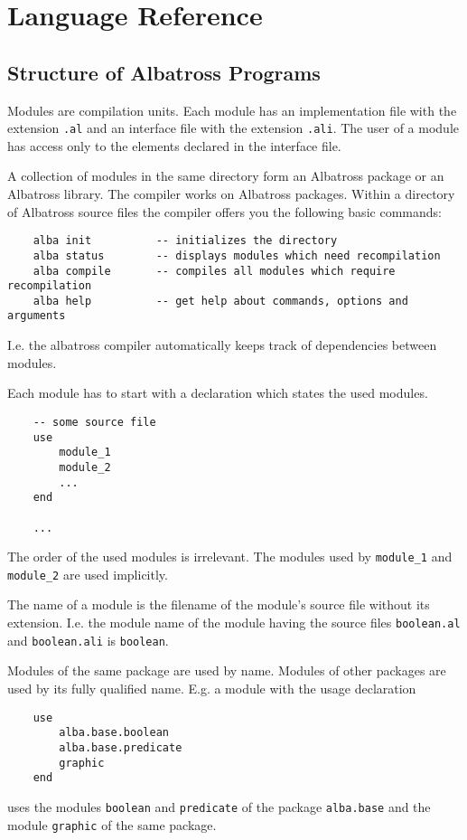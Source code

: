 \chapter{Language Reference}

\section{Structure of Albatross Programs}

Modules are compilation units. Each module has an implementation file with the
extension \lstinline!.al! and an interface file with the extension
\lstinline!.ali!. The user of a module has access only to the elements
declared in the interface file.

A collection of modules in the same directory form an Albatross package or an
Albatross library. The compiler works on Albatross packages. Within a
directory of Albatross source files the compiler offers you the following
basic commands:

\begin{lstlisting}
    alba init          -- initializes the directory
    alba status        -- displays modules which need recompilation
    alba compile       -- compiles all modules which require recompilation
    alba help          -- get help about commands, options and arguments
\end{lstlisting}
  
I.e. the albatross compiler automatically keeps track of dependencies between
modules.

Each module has to start with a declaration which states the used modules.

\begin{lstlisting}
    -- some source file
    use
        module_1
        module_2
        ...
    end
    
    ...
\end{lstlisting}

The order of the used modules is irrelevant. The modules used by \lstinline!module_1!
and \lstinline!module_2! are used implicitly.

The name of a module is the filename of the module's source file without its
extension. I.e. the module name of the module having the source files
\lstinline!boolean.al! and \lstinline!boolean.ali! is \lstinline!boolean!.

Modules of the same package are used by name. Modules of other packages are
used by its fully qualified name. E.g. a module with the usage declaration
\begin{lstlisting}
    use
        alba.base.boolean
        alba.base.predicate
        graphic
    end
\end{lstlisting}
uses the modules \lstinline!boolean! and \lstinline!predicate! of the package
\lstinline!alba.base! and the module \lstinline!graphic! of the same package.

